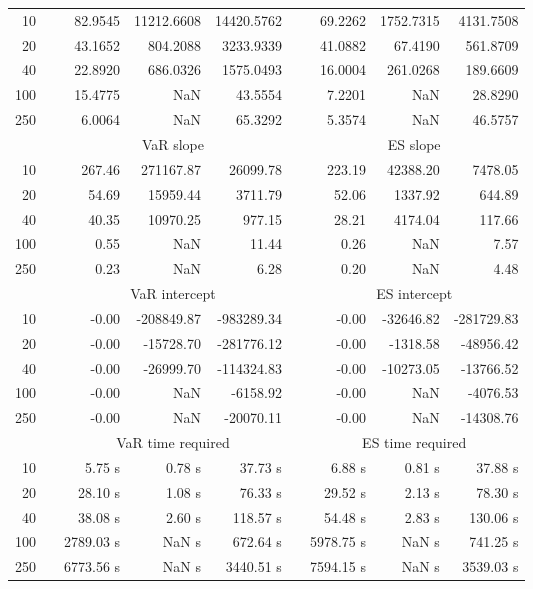 {\begin{table}[h]
\begin{tabular}{rr rrr r rrr}
10 &&  82.9545 & 11212.6608 & 14420.5762 & & 69.2262 & 1752.7315 & 4131.7508 \\ 
20 &&  43.1652 & 804.2088 & 3233.9339 & & 41.0882 & 67.4190 & 561.8709 \\ 
40 &&  22.8920 & 686.0326 & 1575.0493 & & 16.0004 & 261.0268 & 189.6609 \\ 
100 &&  15.4775 &    NaN & 43.5554 & & 7.2201 &    NaN & 28.8290 \\ 
250 &&  6.0064 &    NaN & 65.3292 & & 5.3574 &    NaN & 46.5757 \\ 
\hline 
 & & \multicolumn{3}{c}{ VaR slope} && \multicolumn{3}{c}{ES slope} \\ \cline{3-5}  \cline{7-9}
10 && 267.46 & 271167.87 & 26099.78 && 223.19 & 42388.20 & 7478.05 \\ 
20 && 54.69 & 15959.44 & 3711.79 && 52.06 & 1337.92 & 644.89 \\ 
40 && 40.35 & 10970.25 & 977.15 && 28.21 & 4174.04 & 117.66 \\ 
100 && 0.55 &  NaN & 11.44 && 0.26 &  NaN & 7.57 \\ 
250 && 0.23 &  NaN & 6.28 && 0.20 &  NaN & 4.48 \\ 
\hline 
 & & \multicolumn{3}{c}{ VaR intercept} &&  \multicolumn{3}{c}{ES intercept} \\ \cline{3-5}  \cline{7-9}
10 &&  -0.00 & -208849.87 & -983289.34 && -0.00 & -32646.82 & -281729.83 \\ 
20 &&  -0.00 & -15728.70 & -281776.12 && -0.00 & -1318.58 & -48956.42 \\ 
40 &&  -0.00 & -26999.70 & -114324.83 && -0.00 & -10273.05 & -13766.52 \\ 
100 &&  -0.00 &  NaN & -6158.92 && -0.00 &  NaN & -4076.53 \\ 
250 &&  -0.00 &  NaN & -20070.11 && -0.00 &  NaN & -14308.76 \\ 
\hline 
 & & \multicolumn{3}{c}{VaR time required} && \multicolumn{3}{c}{ES time required} \\ \cline{3-5}  \cline{7-9}
10 & & 5.75 s & 0.78 s & 37.73 s && 6.88 s & 0.81 s & 37.88 s \\ 
20 & & 28.10 s & 1.08 s & 76.33 s && 29.52 s & 2.13 s & 78.30 s \\ 
40 & & 38.08 s & 2.60 s & 118.57 s && 54.48 s & 2.83 s & 130.06 s \\ 
100 & & 2789.03 s &  NaN s & 672.64 s && 5978.75 s &  NaN s & 741.25 s \\ 
250 & & 6773.56 s &  NaN s & 3440.51 s && 7594.15 s &  NaN s & 3539.03 s \\ 

\end{tabular}
\end{table}}
